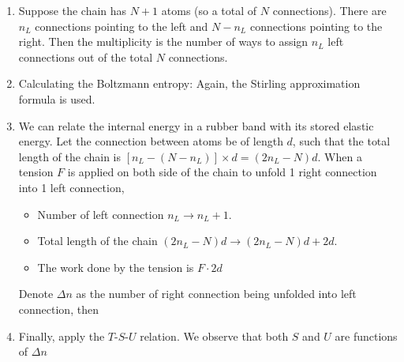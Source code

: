 \documentclass[class=article, crop=false, 12pt]{standalone}
\begin{document}
\begin{enumerate}
    \item Suppose the chain has $N+1$ atoms (so a total of $N$ connections).
    There are $n_L$ connections pointing to the left and 
    $N-n_L$ connections pointing to the right.
    Then the multiplicity is the number of ways to assign $n_L$ left connections out of the total $N$ connections.

    \item Calculating the Boltzmann entropy:
    Again, the Stirling approximation formula is used.

    \item We can relate the internal energy in a rubber band with its stored elastic energy.
    Let the connection between atoms be of length $d$, 
    such that the total length of the chain is $[n_L - (N-n_L)]\times d = (2n_L-N)d$.
    When a tension $F$ is applied on both side of the chain
    to unfold 1 right connection into 1 left connection,


    \begin{itemize}
        \item Number of left connection $n_L \rightarrow n_L+1$.
        \item Total length of the chain $(2n_L-N)d \rightarrow (2n_L-N)d+2d$.
        \item The work done by the tension is $F\cdot 2d$
    \end{itemize}

    Denote $\Delta n$ as the number of right connection being unfolded into left connection,
    then 

    \item Finally, apply the $T$-$S$-$U$ relation.
    We observe that both $S$ and $U$ are functions of $\Delta n$

\end{enumerate}
\end{document}
